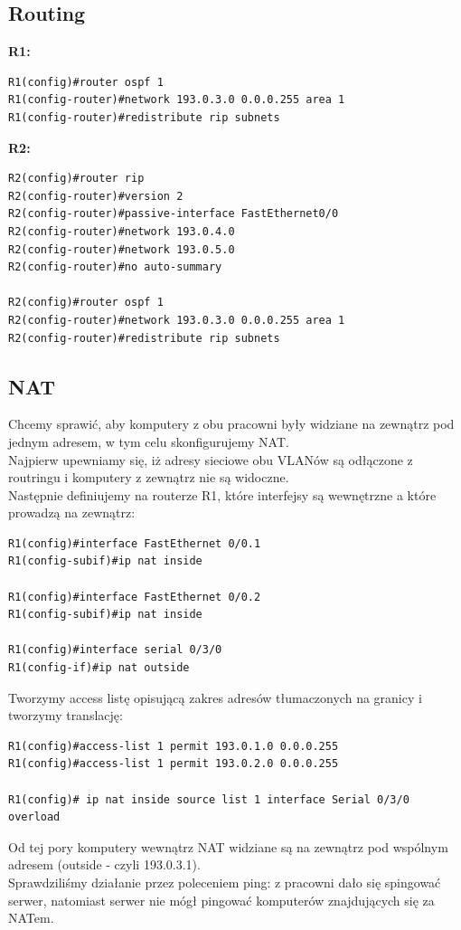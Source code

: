 \documentclass[11pt,a4paper]{article}
\begin{document}
\subsection{Routing}
{\bf R1:}
\begin{lstlisting}
R1(config)#router ospf 1
R1(config-router)#network 193.0.3.0 0.0.0.255 area 1
R1(config-router)#redistribute rip subnets 
 \end{lstlisting}
{\bf R2:}
\begin{lstlisting}
R2(config)#router rip
R2(config-router)#version 2
R2(config-router)#passive-interface FastEthernet0/0
R2(config-router)#network 193.0.4.0
R2(config-router)#network 193.0.5.0
R2(config-router)#no auto-summary

R2(config)#router ospf 1
R2(config-router)#network 193.0.3.0 0.0.0.255 area 1
R2(config-router)#redistribute rip subnets 
 \end{lstlisting}
\subsection{NAT}

Chcemy sprawić, aby komputery z obu pracowni były widziane na zewnątrz pod jednym adresem, w tym celu skonfigurujemy NAT.\\
Najpierw upewniamy się, iż adresy sieciowe obu VLANów są odłączone z routringu i komputery z zewnątrz nie są widoczne.\\
Następnie definiujemy na routerze R1, które interfejsy są wewnętrzne a które prowadzą na zewnątrz:
\begin{lstlisting}
R1(config)#interface FastEthernet 0/0.1
R1(config-subif)#ip nat inside

R1(config)#interface FastEthernet 0/0.2
R1(config-subif)#ip nat inside

R1(config)#interface serial 0/3/0
R1(config-if)#ip nat outside
\end{lstlisting}
Tworzymy access listę opisującą zakres adresów tłumaczonych na granicy i tworzymy translację:
\begin{lstlisting}
R1(config)#access-list 1 permit 193.0.1.0 0.0.0.255
R1(config)#access-list 1 permit 193.0.2.0 0.0.0.255

R1(config)# ip nat inside source list 1 interface Serial 0/3/0 overload
\end{lstlisting}
Od tej pory komputery wewnątrz NAT widziane są na zewnątrz pod wspólnym adresem (outside - czyli 193.0.3.1).\\
Sprawdziliśmy działanie przez poleceniem ping: z pracowni dało się spingować serwer, natomiast serwer nie mógł pingować komputerów znajdujących się za NATem.
 
\end{document}
